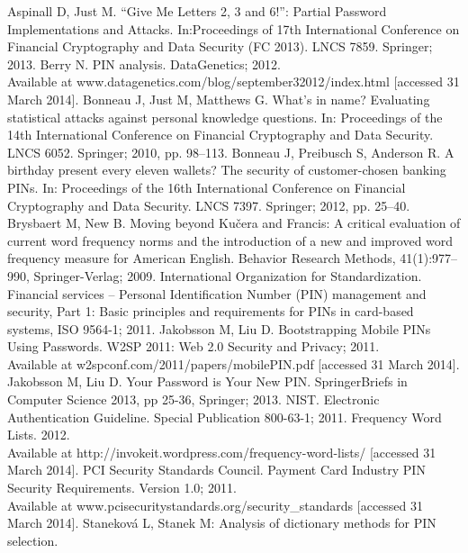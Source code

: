 \documentclass[a4paper, 11pt]{article}
\begin{document}
{\begin{thebibliography}{99}
 Aspinall D, Just M. 
  ``Give Me Letters 2, 3 and 6!'': Partial Password Implementations and Attacks. In:Proceedings of 17th 
  International Conference on Financial Cryptography and Data Security (FC 2013). LNCS 7859. 
  Springer; 2013. 
 Berry N. PIN analysis. DataGenetics; 2012. \\
  Available at www.datagenetics.com/blog/september32012/index.html [accessed 31 March 2014].
 Bonneau J, Just M, Matthews G.
  What's in name? Evaluating statistical attacks against personal knowledge questions.
  In: Proceedings of the 14th International Conference on Financial Cryptography and Data Security.
  LNCS 6052. Springer; 2010, pp. 98--113.
 Bonneau J, Preibusch S, Anderson R.
  A birthday present every eleven wallets? The security of customer-chosen banking PINs.
  In: Proceedings of the 16th International Conference on Financial Cryptography and Data Security.
  LNCS 7397. Springer; 2012, pp. 25--40.
 Brysbaert M, New B.
  Moving beyond Kučera and Francis: A critical evaluation of current word frequency norms and the introduction 
  of a new and improved word frequency measure for American English. Behavior Research Methods, 41(1):977--990,
  Springer-Verlag; 2009.
  International Organization for Standardization. 
  Financial services -- Personal Identification  Number (PIN) management and security,
  Part 1: Basic principles and requirements for PINs in card-based systems,  ISO 9564-1; 2011.
 Jakobsson M, Liu D. Bootstrapping Mobile PINs Using Passwords.
  W2SP 2011: Web 2.0 Security and Privacy; 2011. \\
  Available at w2spconf.com/2011/papers/mobilePIN.pdf [accessed 31 March 2014].
 Jakobsson M, Liu D. Your Password is Your New PIN.
  SpringerBriefs in Computer Science 2013, pp 25-36, Springer; 2013.
 NIST. Electronic Authentication Guideline. Special Publication 800-63-1; 2011.
 Frequency Word Lists. 2012. \\
  Available at http://invokeit.wordpress.com/frequency-word-lists/ [accessed 31 March 2014].
 PCI Security Standards Council. Payment Card Industry PIN Security Requirements. 
  Version 1.0; 2011. \\
  Available at www.pcisecuritystandards.org/security\_standards [accessed 31 March 2014].
 Staneková L, Stanek M: Analysis of dictionary methods for PIN selection. 

\end{thebibliography}}
\end{document}
